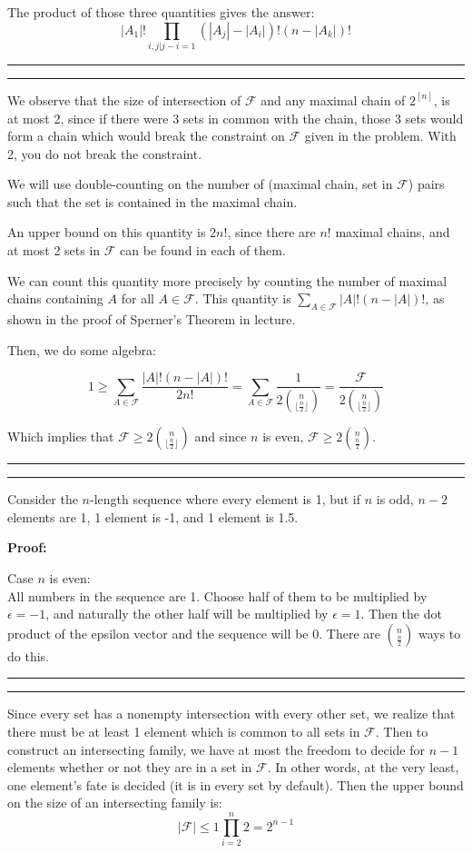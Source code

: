 \documentclass[11pt,letterpaper]{article}
\newcommand{\question}[1] {\vspace{.25in} \hrule\vspace{0.5em}
\noindent{\bf #1} \vspace{0.5em}
\hrule \vspace{.10in}}
\begin{document}
The product of those three quantities gives the answer:
$$|A_1|!\prod_{i,j | j-i = 1} (|A_j| - |A_i|)!(n - |A_k|)!$$

\question{2}
We observe that the size of intersection of $\mathcal{F}$ and any maximal chain of $2^{[n]}$,
is at most 2, since if there were 3 sets in common with the chain,
those 3 sets would form a chain which would break the constraint on $\mathcal{F}$ given in the problem.
With 2, you do not break the constraint.

We will use double-counting on the number of (maximal chain, set in $\mathcal{F}$) pairs such that the set is contained in the maximal chain.

An upper bound on this quantity is $2n!$, since there are $n!$ maximal chains, and at most 2 sets in $\mathcal{F}$ can be found in each of them.

We can count this quantity more precisely by counting the number of maximal chains containing $A$ for all $A \in \mathcal{F}$.
This quantity is $\sum_{A \in \mathcal{F}} |A|!(n-|A|)!$, as shown in the proof of Sperner's Theorem in lecture.

Then, we do some algebra:

$$ 1 \geq \sum_{A \in \mathcal{F}} \frac{|A|!(n-|A|)!}{2n!} = \sum_{A \in \mathcal{F}} \frac{1}{2{n \choose \lfloor \frac{n}{2} \rfloor }} = \frac{\mathcal{F}}{2{n \choose \lfloor \frac{n}{2} \rfloor }}$$

Which implies that $\mathcal{F} \geq 2{n \choose \lfloor \frac{n}{2} \rfloor }$ and since $n$ is even, $\mathcal{F} \geq 2{n \choose \frac{n}{2}}$.


\question{3}
Consider the $n$-length sequence where every element is 1, but if $n$ is odd, $n-2$ elements are 1, 1 element is -1, and 1 element is 1.5.

\textbf{Proof:}

Case $n$ is even:\\
All numbers in the sequence are 1. Choose half of them to be multiplied by $\epsilon = -1$, and naturally the other half will be multiplied by $\epsilon = 1$.
Then the dot product of the epsilon vector and the sequence will be $0$. There are ${n \choose \frac{n}{2}}$ ways to do this.


\question{4}
Since every set has a nonempty intersection with every other set, we realize that there must be at least 1 element which is common to all sets in $\mathcal{F}$.
Then to construct an intersecting family, we have at most the freedom to decide for $n-1$ elements whether or not they are in a set in $\mathcal{F}$. In other words, at the very least, one element's fate is decided (it is in every set by default).
Then the upper bound on the size of an intersecting family is:
$$ |\mathcal{F}| \leq 1 \prod_{i=2}^{n} 2 = 2^{n-1}$$
\end{document}
